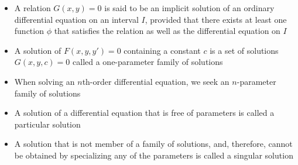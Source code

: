 \documentclass[12pt]{article}
\begin{document}
\begin{itemize}
  \item A relation $G(x,y)=0$ is said to be an implicit solution of an ordinary differential equation on an interval $I$, provided that there exists at least one function $\phi$ that satisfies the relation as well as the differential equation on $I$

  \item A solution of $F(x,y,y')=0$ containing a constant $c$ is a set of solutions $G(x,y,c)=0$ called a one-parameter family of solutions

  \item When solving an $n$th-order differential equation, we seek an $n$-parameter family of solutions

  \item A solution of a differential equation that is free of parameters is called a particular solution

  \item A solution that is not member of a family of solutions, and, therefore, cannot be obtained by specializing any of the parameters is called a singular solution

\end{itemize}
\end{document}
